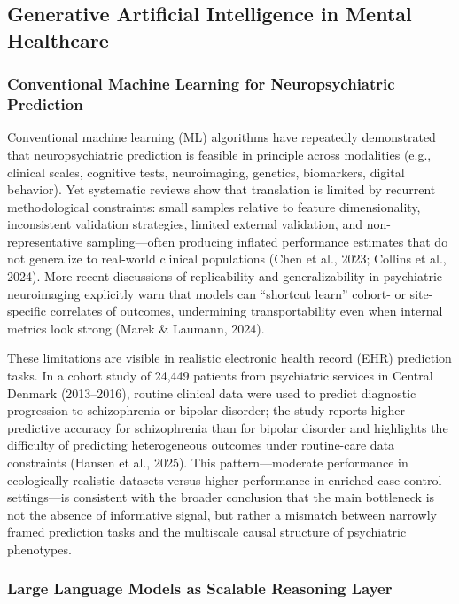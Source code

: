 \documentclass[11pt,a4paper,twoside]{article}
\begin{document}
\subsection{Generative Artificial Intelligence in Mental Healthcare}

\subsubsection{Conventional Machine Learning for Neuropsychiatric Prediction}

Conventional machine learning (ML) algorithms have repeatedly demonstrated that neuropsychiatric prediction is feasible in principle across modalities (e.g., clinical scales, cognitive tests, neuroimaging, genetics, biomarkers, digital behavior). Yet systematic reviews show that translation is limited by recurrent methodological constraints: small samples relative to feature dimensionality, inconsistent validation strategies, limited external validation, and non-representative sampling---often producing inflated performance estimates that do not generalize to real-world clinical populations (Chen et al., 2023; Collins et al., 2024). More recent discussions of replicability and generalizability in psychiatric neuroimaging explicitly warn that models can ``shortcut learn'' cohort- or site-specific correlates of outcomes, undermining transportability even when internal metrics look strong (Marek \& Laumann, 2024).

These limitations are visible in realistic electronic health record (EHR) prediction tasks. In a cohort study of 24,449 patients from psychiatric services in Central Denmark (2013--2016), routine clinical data were used to predict diagnostic progression to schizophrenia or bipolar disorder; the study reports higher predictive accuracy for schizophrenia than for bipolar disorder and highlights the difficulty of predicting heterogeneous outcomes under routine-care data constraints (Hansen et al., 2025). This pattern---moderate performance in ecologically realistic datasets versus higher performance in enriched case-control settings---is consistent with the broader conclusion that the main bottleneck is not the absence of informative signal, but rather a mismatch between narrowly framed prediction tasks and the multiscale causal structure of psychiatric phenotypes.

\subsubsection{Large Language Models as Scalable Reasoning Layer}
\end{document}
